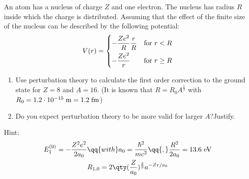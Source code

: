 \begin{esercizio}%
   An atom has a nucleus of charge $Z$ and one electron. The nucleus has radius $R$ inside which the charge is distributed. Assuming that the effect of the finite size of the nucleus can be described by the following potential:
   \begin{equation*}
      V(r)=
      \begin{dcases}
         -\frac{Z e^2}{R} \frac{r}{R} & \text{for } r<R\\
         -\frac{Z e^2}{r} & \text{for } r \geq R
      \end{dcases}
   \end{equation*}
   \begin{enumerate}[label=\alph*), leftmargin=0.6cm]
      \item Use perturbation theory to calculate the first order correction to the ground state for $Z=8$ and $A=16$. (It is known that $R=R_0A^{\frac{1}{3}}$ with $R_0=1.2 \cdot 10^{-15} \; \rm m=1.2 \; fm$)
      \item Do you expect perturbation theory to be more valid for larger $A$?\footnotemark\;Justify.
   \end{enumerate}
   Hint:
   \begin{gather*}
      E_1^{(0)}=-\frac{Z^2 e^2}{2a_0}
      \qq{with}
      a_0=\frac{\hbar^2}{mc^2}
      \qq{,}
      \frac{R^2}{2a_0}=13.6 \text{ eV}
      \\
      R_{1,0}=2\qty( \frac{Z}{a_0} )^{\frac{3}{2}} a^{-Zr/a_0}
   \end{gather*}
\end{esercizio}
